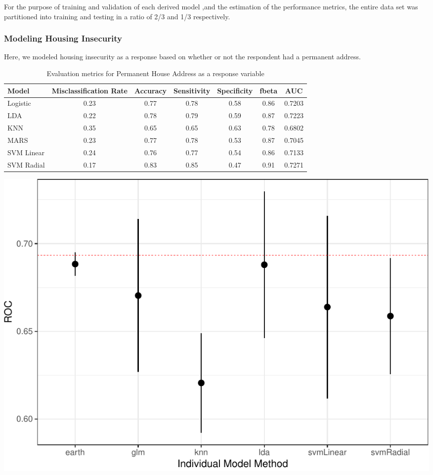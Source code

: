 \documentclass[
  10pt,
]{article}
\begin{document}
For the purpose of training and validation of each derived model ,and the estimation of the performance metrics, the entire data set was partitioned into training and testing in a ratio of 2/3 and 1/3 respectively.

\hypertarget{modeling-housing-insecurity}{%
\subsubsection{Modeling Housing Insecurity}\label{modeling-housing-insecurity}}

Here, we modeled housing insecurity as a response based on whether or not the respondent had a permanent address.

\begin{table}[H]

\caption{\label{tab:unnamed-chunk-9}Evaluation metrics for Permanent House Address  as a response variable}
\centering
\fontsize{12}{14}\selectfont
\begin{tabular}[t]{lcccccc}
\toprule
Model & Misclassification Rate & Accuracy & Sensitivity & Specificity & fbeta & AUC\\
\midrule
Logistic & 0.23 & 0.77 & 0.78 & 0.58 & 0.86 & 0.7203\\
LDA & 0.22 & 0.78 & 0.79 & 0.59 & 0.87 & 0.7223\\
KNN & 0.35 & 0.65 & 0.65 & 0.63 & 0.78 & 0.6802\\
MARS & 0.23 & 0.77 & 0.78 & 0.53 & 0.87 & 0.7045\\
SVM Linear & 0.24 & 0.76 & 0.77 & 0.54 & 0.86 & 0.7133\\
SVM Radial & 0.17 & 0.83 & 0.85 & 0.47 & 0.91 & 0.7271\\
\bottomrule
\end{tabular}
\end{table}

\includegraphics{phase2_report_files/figure-latex/unnamed-chunk-9-1}
\end{document}
